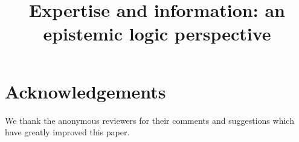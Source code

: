 \documentclass[sn-apa]{sn-jnl}%
\theoremstyle{thmstyleone}%
\theoremstyle{thmstyletwo}%
\theoremstyle{thmstylethree}%
\begin{document}
\newcommand{\papertitle}{Expertise and information: an epistemic logic perspective}

\title[\papertitle]{\papertitle}

\author[1]{ }
\author[1]{ }

\abstract{
    
}


\maketitle



\section*{Acknowledgements} We thank the anonymous reviewers for their
comments and suggestions which have greatly improved this paper.

%
\end{document}
